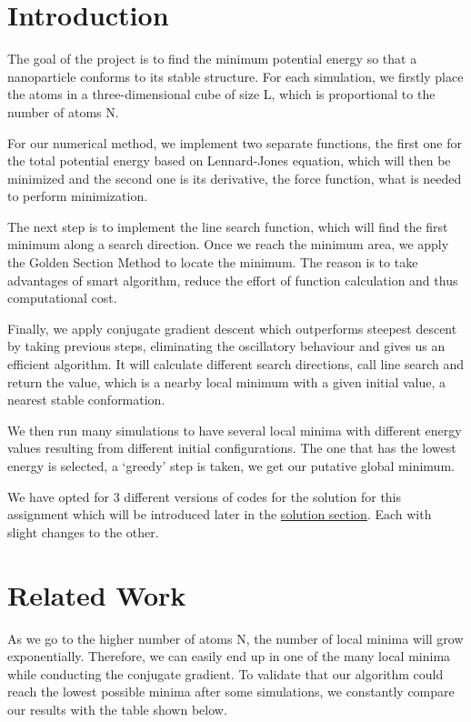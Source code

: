 \documentclass{scrartcl}
\begin{document}
\section{Introduction}
\par The goal of the project is to find the minimum potential energy so that a nanoparticle conforms to its stable structure. For each simulation, we firstly place the atoms in a three-dimensional cube of size L, which is proportional to the number of atoms N. 
\par For our numerical method, we implement two separate functions, the first one for the total potential energy based on Lennard-Jones equation, which will then be minimized and the second one is its derivative, the force function, what is needed to perform minimization.
\par The next step is to implement the line search function, which will find the first minimum along a search direction. Once we reach the minimum area, we apply the Golden Section Method to locate the minimum. The reason is to take advantages of smart algorithm, reduce the effort of function calculation and thus computational cost.
\par Finally, we apply conjugate gradient descent which outperforms steepest descent by taking previous steps, eliminating the oscillatory behaviour and gives us an efficient algorithm. It will calculate different search directions, call line search and return the value, which is a nearby local minimum with a given initial value, a nearest stable conformation.
\par We then run many simulations to have several local minima with different energy values resulting from different initial configurations. The one that has the lowest energy is selected, a ‘greedy’ step is taken, we get our putative global minimum.
\par We have opted for 3 different versions of codes for the solution for this assignment which will be introduced later in the \hyperref[sec:Solution]{solution section}. Each with slight changes to the other. 
\par 

\newpage
\section{Related Work}
\par As we go to the higher number of atoms N, the number of local minima will grow exponentially. Therefore, we can easily end up in one of the many local minima while conducting the conjugate gradient. To validate that our algorithm could reach the lowest possible minima after some simulations, we constantly compare our results with the table shown below. 
\end{document}
